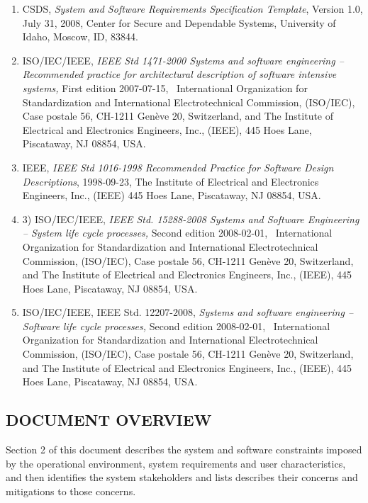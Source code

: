 \documentclass[twoside,letterpaper]{article}
\newcommand\liststyleWWviiiNumii{%
\renewcommand\theenumi{\arabic{enumi}}
\renewcommand\theenumii{\arabic{enumii}}
\renewcommand\theenumiii{\arabic{enumiii}}
\renewcommand\theenumiv{\arabic{enumiv}}
\renewcommand\labelenumi{\theenumi)}
\renewcommand\labelenumii{\theenumii.}
\renewcommand\labelenumiii{\theenumiii.}
\renewcommand\labelenumiv{\theenumiv.}
}
\begin{document}
{\liststyleWWviiiNumii
\begin{enumerate}
\item {
{CSDS,
}{\textit{System and Software Requirements
Specification Template}}{, Version 1.0, July
31, 2008, Center for Secure and Dependable Systems, University of
Idaho, Moscow, ID, 83844.}}
\item {
{ISO/IEC/IEEE,
}{\textit{IEEE Std 1471-2000 Systems and
software engineering -- Recommended practice for architectural
description of software intensive systems,}}{
First edition 2007-07-15, \ International Organization for
Standardization and International Electrotechnical Commission,
(ISO/IEC), Case postale 56, CH-1211 Gen\`{e}ve 20, Switzerland, and The
Institute of Electrical and Electronics Engineers, Inc., (IEEE), 445
Hoes Lane, Piscataway, NJ 08854, USA.}}
\item {
{IEEE, }{\textit{IEEE
Std 1016-1998 Recommended Practice for Software Design
Descriptions}}{, 1998-09-23, The Institute of
Electrical and Electronics Engineers, Inc., (IEEE) 445 Hoes Lane,
Piscataway, NJ 08854, USA.}}
\item {
{3) ISO/IEC/IEEE,
}{\textit{IEEE Std. 15288-2008 Systems and
Software Engineering -- System life cycle
processes,}}{ Second edition 2008-02-01,
\ International Organization for Standardization and International
Electrotechnical Commission, (ISO/IEC), Case postale 56, CH-1211 Gen\`{e}ve
20, Switzerland, and The Institute of Electrical and Electronics
Engineers, Inc., (IEEE), 445 Hoes Lane, Piscataway, NJ 08854, USA.}}
\item {
{ISO/IEC/IEEE, IEEE Std. 12207-2008,
}{\textit{Systems and software engineering --
Software life cycle processes, }}{Second
edition 2008-02-01, \ International Organization for Standardization
and International Electrotechnical Commission, (ISO/IEC), Case postale
56, CH-1211 }{Gen\`{e}ve 20, Switzerland, and The
Institute of Electrical and Electronics Engineers, Inc., (IEEE), 445
Hoes Lane, Piscataway, NJ 08854, USA.}}
\end{enumerate}


\clearpage
\subsection{DOCUMENT OVERVIEW}

{
Section 2 of this document describes the system and software constraints
imposed by the operational environment, system requirements and user
characteristics, and then identifies the system stakeholders and lists
describes their concerns and mitigations to those concerns.}

}
\end{document}
